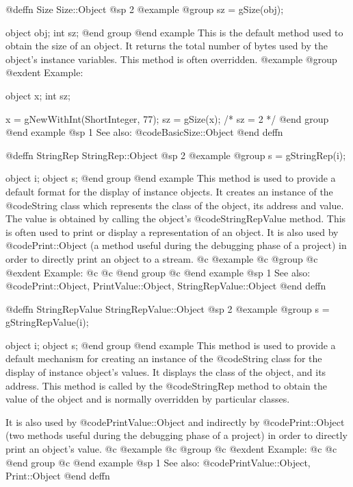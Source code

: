 @deffn {Size} Size::Object
@sp 2
@example
@group
sz = gSize(obj);

object  obj;
int     sz;
@end group
@end example
This is the default method used to obtain the size of an object.
It returns the total number of bytes used by the object's instance variables.
This method is often overridden.
@example
@group
@exdent Example:

object  x;
int     sz;

x = gNewWithInt(ShortInteger, 77);
sz = gSize(x);    /*  sz = 2  */
@end group
@end example
@sp 1
See also:  @code{BasicSize::Object}
@end deffn












@deffn {StringRep} StringRep::Object
@sp 2
@example
@group
s = gStringRep(i);

object  i;
object  s;
@end group
@end example
This method is used to provide a default format for the display of
instance objects.  It creates an instance of the @code{String} class
which represents the class of the object, its address and value.  The
value is obtained by calling the object's @code{StringRepValue} method.
This is often used to print or display a representation of an object.
It is also used by @code{Print::Object} (a method useful during the
debugging phase of a project) in order to directly print an object to a
stream.
@c @example
@c @group
@c @exdent Example:
@c
@c @end group
@c @end example
@sp 1
See also:  @code{Print::Object, PrintValue::Object, StringRepValue::Object}
@end deffn











@deffn {StringRepValue} StringRepValue::Object
@sp 2
@example
@group
s = gStringRepValue(i);

object  i;
object  s;
@end group
@end example
This method is used to provide a default mechanism for creating an
instance of the @code{String} class for the display of instance object's
values.  It displays the class of the object, and its address.  This
method is called by the @code{StringRep} method to obtain the value of
the object and is normally overridden by particular classes.

It is also used by @code{PrintValue::Object} and indirectly by
@code{Print::Object} (two methods useful during the debugging phase of a
project) in order to directly print an object's value.
@c @example
@c @group
@c @exdent Example:
@c 
@c @end group
@c @end example
@sp 1
See also:  @code{PrintValue::Object, Print::Object}
@end deffn
















